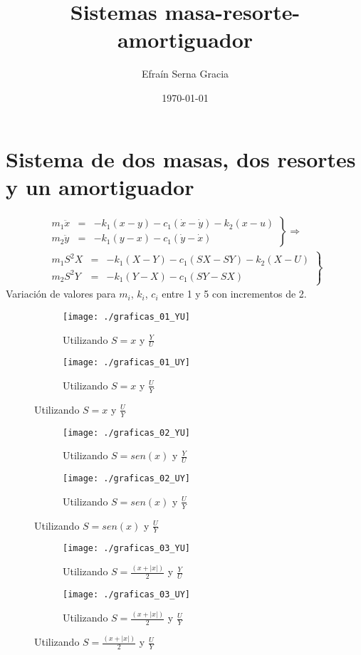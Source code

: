 \documentclass[12pt,spanish,lettersize]{article}
\title{\color{Maroon}Sistemas masa-resorte-amortiguador}
\author{Efra\'in Serna Gracia}
\date{\color{gray}\today}
\begin{document}
\maketitle
\tableofcontents
\tableofimages
\section{Sistema de dos masas, dos resortes y un amortiguador}
\begin{eqnarray}
\left.\begin{array}{rcl}
m_1\ddot{x}&=&-k_1(x-y)-c_1(\dot{x}-\dot{y})-k_2(x-u)\\
m_2\ddot{y}&=&-k_1(y-x)-c_1(\dot{y}-\dot{x})
\end{array}\right\}\Rightarrow\\
\left.\begin{array}{rcl}
m_1S^2X&=&-k_1(X-Y)-c_1(SX-SY)-k_2(X-U)\\
m_2S^2Y&=&-k_1(Y-X)-c_1(SY-SX)
\end{array}\right\}
\end{eqnarray}
Variaci\'on de valores para $m_i$, $k_i$, $c_i$ entre 1 y 5 con incrementos de 2.\\
\begin{figure}[h]
\begin{subfigure}{0.45\textwidth}
\texttt{[image: ./graficas\_01\_YU]}
\caption{Utilizando $S=x$ y $\frac{Y}{U}$}
\end{subfigure}
\begin{subfigure}{0.45\textwidth}
\texttt{[image: ./graficas\_01\_UY]}
\caption{Utilizando $S=x$ y $\frac{U}{Y}$}
\end{subfigure}
\end{figure}
\begin{figure}[h]
\begin{subfigure}{0.45\textwidth}
\texttt{[image: ./graficas\_02\_YU]}
\caption{Utilizando $S=sen(x)$ y $\frac{Y}{U}$}
\end{subfigure}
\begin{subfigure}{0.45\textwidth}
\texttt{[image: ./graficas\_02\_UY]}
\caption{Utilizando $S=sen(x)$ y $\frac{U}{Y}$}
\end{subfigure}
\end{figure}
\begin{figure}[h]
\begin{subfigure}{0.45\textwidth}
\texttt{[image: ./graficas\_03\_YU]}
\caption{Utilizando $S=\frac{(x+|x|)}{2}$ y $\frac{Y}{U}$}
\end{subfigure}
\begin{subfigure}{0.45\textwidth}
\texttt{[image: ./graficas\_03\_UY]}
\caption{Utilizando $S=\frac{(x+|x|)}{2}$ y $\frac{U}{Y}$}
\end{subfigure}
\end{figure}
\end{document}
